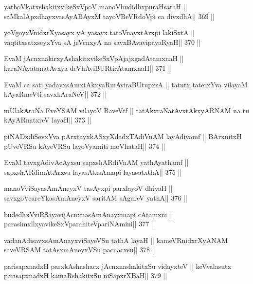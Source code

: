\begin{shl}
yathoVkatxshakitxvikeSxVpoV manoVbudidhxpuraHsaraH ||
saMkalApxdhayxvasAyABAyxM tayoVBeVRdoV\s pi ca divxdhA\hfill || 369 ||
\end{shl}

\begin{shl}
yoVgoyxVnidxrXyasayx yA yasayx tatoV\s nayxtArxpi lakiSxtA ||
vaqtitxsatxseyxYva sA jeVcnxyA na savxBAvavipayaRyaH\hfill || 370 ||
\end{shl}

\begin{shl}
EvaM jAcnxnakirxyAshakitxvikeSxVpAjajxgadAtamxnaH ||
karaNAyatanatAvxya deVhAviBURtirAtamxnaH\hfill || 371 ||
\end{shl}

\begin{shl}
EvaM ca sati yadayxsAmxtAkxyaRmAviraBUtupxrA ||
tatutx taterxYva vilayaM kAyaRmeVti savxkAraNeV\hfill || 372 ||
\end{shl}

\begin{shl}
mUlakAraNa EveYSAM vilayoV BaveVtf ||
tatAkxraNatAvxtAkxyARNAM na tu kAyARnatxreV layaH\hfill || 373 ||
\end{shl}

\begin{shl}
piNADxdiSevxVva pArxtayxkASxyXdadxTAdiVnAM layAdiyamf ||
BArxnitxH pUveVRSu kAyeVRSu layoV\s yamiti moVhataH\hfill || 374 ||
\end{shl}

\begin{shl}
EvaM tavxgAdivAcAyxsu sapxshARdiVnAM yathAyathamf ||
sapxshARdimAtArxsu layasAtxsAmapi layasatxthA\hfill || 375 ||
\end{shl}

\begin{shl}
manoVviSayasAmAneyxV tasAyxpi parxlayoV dhiyaH ||
savxgoVcareYkasAmAneyxV saritAM sAgareV yathA\hfill || 376 ||
\end{shl}

\begin{shl}
budedhxVviRSayavijAcnxnasAmAnayxmapi cA\s\s tamxni ||
parasimxllxyavikeSxVparahiteV\s pariNAmini\hfill || 377 ||
\end{shl}

\begin{shl}
vadanAdisavxsAmAnayxviSayeVSu tathA layaH ||
kameVRnidxrXyANAM saveVRSAM tatAsxmAneyxVSu pacnacxsu\hfill || 378 ||
\end{shl}

\begin{shl}
parisapxnadxH parxkAshashacx jAcnxnashakitxSu vidayxteV ||
keVvalasutx parisapxnadxH kamaRshakitxSu niSapxrXBaH\hfill || 379 ||
\end{shl}

